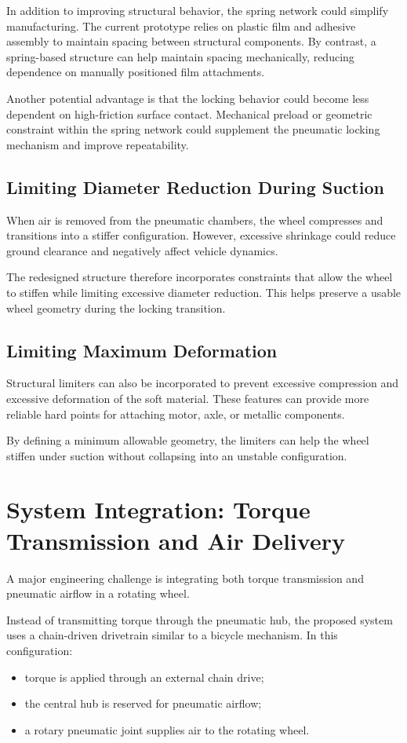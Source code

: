 \documentclass[11pt]{article}
\begin{document}
In addition to improving structural behavior, the spring network could simplify manufacturing. The current prototype relies on plastic film and adhesive assembly to maintain spacing between structural components. By contrast, a spring-based structure can help maintain spacing mechanically, reducing dependence on manually positioned film attachments.

Another potential advantage is that the locking behavior could become less dependent on high-friction surface contact. Mechanical preload or geometric constraint within the spring network could supplement the pneumatic locking mechanism and improve repeatability.

\subsection{Limiting Diameter Reduction During Suction}
When air is removed from the pneumatic chambers, the wheel compresses and transitions into a stiffer configuration. However, excessive shrinkage could reduce ground clearance and negatively affect vehicle dynamics.

The redesigned structure therefore incorporates constraints that allow the wheel to stiffen while limiting excessive diameter reduction. This helps preserve a usable wheel geometry during the locking transition.

\subsection{Limiting Maximum Deformation}
Structural limiters can also be incorporated to prevent excessive compression and excessive deformation of the soft material. These features can provide more reliable hard points for attaching motor, axle, or metallic components.

By defining a minimum allowable geometry, the limiters can help the wheel stiffen under suction without collapsing into an unstable configuration.

\section{System Integration: Torque Transmission and Air Delivery}
A major engineering challenge is integrating both torque transmission and pneumatic airflow in a rotating wheel.

Instead of transmitting torque through the pneumatic hub, the proposed system uses a chain-driven drivetrain similar to a bicycle mechanism. In this configuration:
\begin{itemize}
  \item torque is applied through an external chain drive;
  \item the central hub is reserved for pneumatic airflow;
  \item a rotary pneumatic joint supplies air to the rotating wheel.
\end{itemize}
\end{document}
